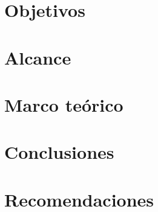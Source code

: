 \documentclass[11pt, letterpaper, twoside, openright]{report}
\newcommand{\defaultparformat}[1]{
	{\setlength{\parskip}{2ex}
     }
}
\begin{document}
	\chapter{Objetivos}
	\ifdefined\parpordefecto
		\defaultparformat{g-objetivos}
	\else
		
	\fi
\fi

\ifdefined\CAPalcance
	\newpage
	\chapter{Alcance}
	\ifdefined\parpordefecto
    	\defaultparformat{h-alcance}
    \else
    	
    \fi 
\fi

\ifdefined\CAPmarcoteorico
	\newpage
	\chapter{Marco teórico}
	\ifdefined\parpordefecto
		\defaultparformat{i-marco_teorico}
	\else
		
	\fi
\fi

\newpage
\ifdefined\parpordefecto
	\defaultparformat{j-capitulos}
\else
	
\fi

\ifdefined\CAPconclusiones
	\newpage
	\chapter{Conclusiones}
	\ifdefined\parpordefecto
		\defaultparformat{k-conclusiones}
	\else
		
	\fi
\fi

\ifdefined\CAPrecomendaciones
	\newpage
	\chapter{Recomendaciones}
	\ifdefined\parpordefecto
		\defaultparformat{l-recomendaciones}
	\else
		
	\fi
\fi

\ifdefined\CAPbibliografia
	\newpage
    \cleardoublepage{}
	\chapter{\bibname}
    \printbibliography[heading=none]
\fi
\end{document}
